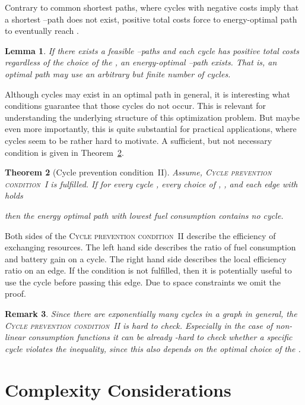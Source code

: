 \documentclass[a4paper]{scrartcl}
\newtheorem{theorem}{Theorem}
\newtheorem{lemma}[theorem]{Lemma}
\newtheorem{remark}[theorem]{Remark}
\begin{document}
Contrary to common shortest paths, where cycles with negative costs imply that a shortest --path does not exist, positive total costs force to energy-optimal path to eventually reach .

\begin{lemma}
If there exists a feasible --paths and each cycle has positive total costs regardless of the choice of the , an energy-optimal --path exists. That is, an optimal path may use an arbitrary but finite number of cycles.
\end{lemma}

Although cycles may exist in an optimal path in general, it is interesting what conditions guarantee that those cycles do not occur. This is relevant for understanding the underlying structure of this optimization problem. But maybe even more importantly, this is quite substantial for practical applications, where cycles seem to be rather hard to motivate. A sufficient, but not necessary condition is given in Theorem~\ref{theo:nocycles}.

\begin{theorem}[Cycle prevention condition~II]\label{theo:nocycles} Assume, \textsc{Cycle prevention condition~I} is fulfilled. If for every cycle , every choice of , , and each edge  with  holds

then the energy optimal path with lowest fuel consumption contains no cycle.
\end{theorem}

Both sides of the \textsc{Cycle prevention condition~II} describe the efficiency of exchanging resources. The left hand side describes the ratio of fuel consumption and battery gain on a cycle. The right hand side describes the local efficiency ratio on an edge. If the condition is not fulfilled, then it is potentially useful to use the cycle before passing this edge. Due to space constraints we omit the proof.

\begin{remark}
 Since there are exponentially many cycles in a graph in general, the \textsc{Cycle prevention condition~II} is hard to check. Especially in the case of non-linear consumption functions it can be already -hard to check whether a specific cycle violates the inequality, since this also depends on the optimal choice of the .
\end{remark}

\section{Complexity Considerations}
\end{document}
